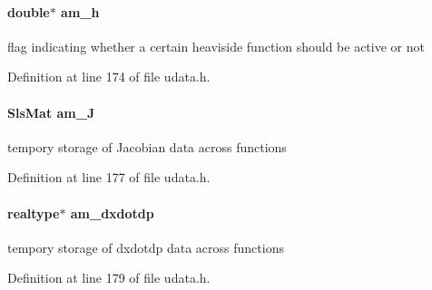 \paragraph[{am\+\_\+h}]{\setlength{\rightskip}{0pt plus 5cm}double$\ast$ am\+\_\+h}\label{struct_user_data_a1a976a80dc74446059468485a0f279e1}
flag indicating whether a certain heaviside function should be active or not 

Definition at line 174 of file udata.\+h.

\hypertarget{struct_user_data_a822be7d2872832008aa0b7c0282b04f6}{}
\paragraph[{am\+\_\+\+J}]{\setlength{\rightskip}{0pt plus 5cm}Sls\+Mat am\+\_\+\+J}\label{struct_user_data_a822be7d2872832008aa0b7c0282b04f6}
tempory storage of Jacobian data across functions 

Definition at line 177 of file udata.\+h.

\hypertarget{struct_user_data_a04716137a064f7c6d85c04aeb235b4f0}{}
\paragraph[{am\+\_\+dxdotdp}]{\setlength{\rightskip}{0pt plus 5cm}realtype$\ast$ am\+\_\+dxdotdp}\label{struct_user_data_a04716137a064f7c6d85c04aeb235b4f0}
tempory storage of dxdotdp data across functions 

Definition at line 179 of file udata.\+h.

